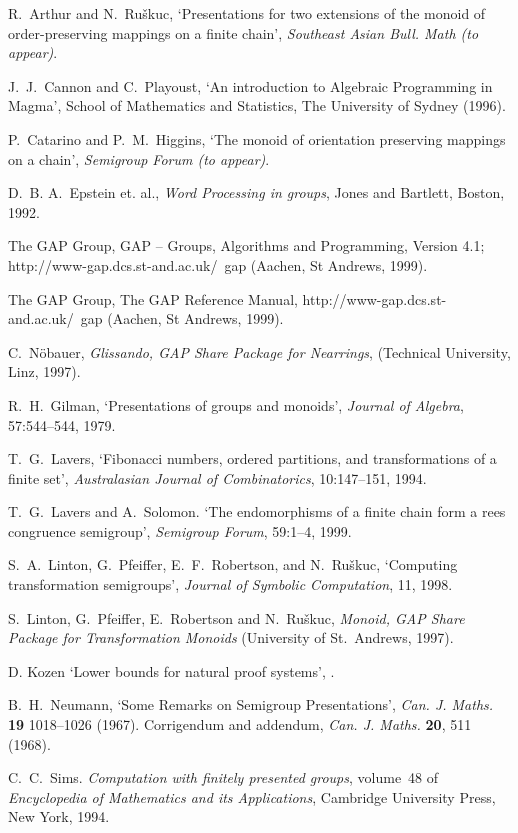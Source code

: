 \documentclass{ws-p8-50x6-00}
\theoremstyle{plain} \newtheorem{Thm}{Theorem}
\theoremstyle{plain} \newtheorem{Cor}{Corollary}
\theoremstyle{plain} \newtheorem{Lemma}{Lemma}
\theoremstyle{plain} \newtheorem{Prop}{Proposition}
\theoremstyle{plain} \newtheorem{Ex}{Exercise}
\def\gap{\sf GAP}
\begin{document}


\begin{thebibliography}{1}

 R.~Arthur and N.~Ru\v{s}kuc,
`Presentations for two extensions of the monoid of order-preserving
mappings on a finite chain', {\em Southeast Asian Bull. Math (to appear)}.


 J.~J.~Cannon and C.~Playoust,
{`An introduction to Algebraic Programming in Magma'},
School of Mathematics and Statistics, The University of Sydney (1996).

P.~Catarino and P.~M.~Higgins,
`The monoid of orientation preserving mappings on a chain',
{\em Semigroup Forum (to appear)}.

D.~B. A.~Epstein et. al.,
{\em Word Processing in groups},
Jones and Bartlett, Boston, 1992.


 The GAP Group, {\gap} -- Groups, Algorithms and Programming,
Version 4.1; http://www-gap.dcs.st-and.ac.uk/~gap (Aachen, St Andrews, 1999).


 The GAP Group, The {\gap} Reference Manual,
http://www-gap.dcs.st-and.ac.uk/~gap
(Aachen, St Andrews, 1999).


 C.~N\"obauer, {\em Glissando,  
{\gap} Share Package for Nearrings},
(Technical University, Linz, 1997). 


R.~H.~Gilman,
`Presentations of groups and monoids',
{\em Journal of Algebra}, 57:544--544, 1979.

T.~G.~Lavers,
`Fibonacci numbers, ordered partitions, and transformations of a
finite set', {\em Australasian Journal of Combinatorics}, 
10:147--151, 1994.

T.~G.~Lavers and A.~Solomon.
`The endomorphisms of a finite chain form a rees congruence semigroup',
{\em Semigroup Forum}, 59:1--4, 1999.

S.~A.~Linton, G.~Pfeiffer, E.~F.~Robertson, and N.~Ru\v{s}kuc,
`Computing transformation semigroups',
{\em Journal of Symbolic Computation}, 11, 1998.

 S.~Linton, G.~Pfeiffer, E.~Robertson and N.~Ru\v{s}kuc,
{\em Monoid, {\gap} Share Package for Transformation Monoids}
(University of St.~Andrews, 1997). 


 D. Kozen `Lower bounds for natural proof systems',
.






 B.~H.~Neumann, 
`Some Remarks on Semigroup Presentations',
{\em Can. J. Maths.} {\bf 19} 1018--1026 (1967). Corrigendum and addendum,
{\em Can. J. Maths.} {\bf 20}, 511 (1968).


C.~C.~Sims.
{\em Computation with finitely presented groups}, 
volume~48 of {\em Encyclopedia of Mathematics and its Applications},
Cambridge University Press, New York, 1994.

\end{thebibliography}
\end{document}
